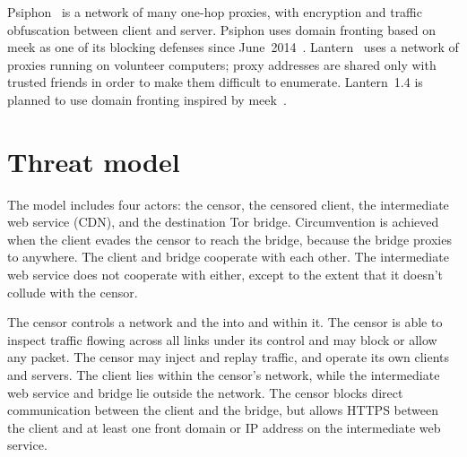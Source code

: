 \documentclass[conference]{IEEEtran}
\begin{document}
Psiphon~\cite{psiphon} is a network of many one-hop proxies,
with encryption and traffic obfuscation between client and server.
Psiphon uses domain fronting based on meek as one of its blocking defenses since June~2014~\cite{psiphon-meek-merge}.
Lantern~\cite{lantern} uses a network of proxies running on volunteer computers;
proxy addresses are shared only with trusted friends in order to make them difficult to enumerate.
Lantern~1.4 is planned to use domain fronting inspired by meek~\cite{lantern-1.3.1}.



\section{Threat model}

The model includes four actors:
the censor,
the censored client,
the intermediate web service (CDN),
and the destination Tor bridge.
Circumvention is achieved when the client evades the censor to reach
the bridge,
because the bridge proxies to anywhere.
The client and bridge cooperate with each other.
The intermediate web service does not cooperate with either,
except to the extent that it doesn't collude with the censor.

The censor controls a network and the into and within it.
The censor is able to inspect traffic flowing across all links under its control
and may block or allow any packet.
The censor may inject and replay traffic, and
operate its own clients and servers.
The client lies within the censor's network,
while the intermediate web service and bridge lie outside the network.
The censor blocks direct communication between the client and the bridge,
but allows HTTPS between the client and at least one front domain or IP address
on the intermediate web service.

\end{document}
